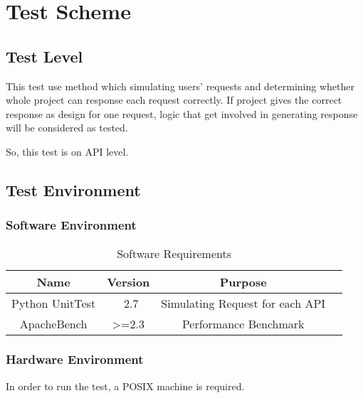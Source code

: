\section{Test Scheme}
\label{test-scheme}
  \subsection{Test Level}
    This test use method which simulating users' requests
    and determining whether whole project can response each request correctly.
    If project gives the correct response as design for one request, logic that get involved in generating response will be considered as tested.

    So, this test is on API level.

  \subsection{Test Environment}
    \subsubsection{Software Environment}
    \begin{table}[H]
        \begin{tabular}{c|c|c|c}
          \hline
          Name & Version & Purpose \\ \hline
          Python UnitTest & ~2.7 & Simulating Request for each API \\ \hline
          ApacheBench & >=2.3 & Performance Benchmark \\ \hline
        \end{tabular}
        \caption{Software Requirements\label{tab:Software}}
      \end{table}
    \subsubsection{Hardware Environment}
      In order to run the test, a POSIX machine is required.

